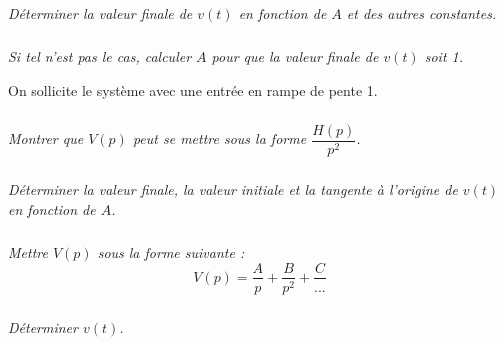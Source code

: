 \documentclass[10pt]{article}
\newif\ifprof
\begin{document}
\subparagraph{}
\textit{Déterminer la valeur finale de $v(t)$ en fonction de $A$ et des autres constantes. }
\ifprof
\begin{corrige}
D'après le théorème de la valeur finale, on a : 
$$
\lim\limits_{t\to +\infty} v(t)= 
\lim\limits_{p\to 0} p\cdot V(p)= \dfrac{AK_1}{1+K_1A}
$$
\end{corrige}
\else
\fi



\subparagraph{}
\textit{Si tel n’est pas le cas, calculer $A$ pour que la valeur finale de $v(t)$ soit 1.}
\ifprof
\begin{corrige}
Une valeur finale de 1 permet de satisfaire l'exigence d'avoir un écart statique nul.
$$
\dfrac{AK_1}{1+K_1A} = 1 
\Longleftrightarrow AK_1 = 1+K_1A
$$

\end{corrige}
\else
\fi

On sollicite le système avec une entrée en rampe de pente 1. 

\subparagraph{}
\textit{Montrer que $V(p)$ peut se mettre sous la forme $\dfrac{H(p)}{p^2}$. }
\ifprof
\begin{corrige}
La fonction de transfert d'une rampe de pente 1 est égale à $V_c(p)=\dfrac{1}{p^2}$
\end{corrige}
\else
\fi



\subparagraph{}
\textit{Déterminer la valeur finale, la valeur initiale et la tangente à l’origine de $v(t)$ en fonction de $A$.}
\ifprof
\begin{corrige}
\end{corrige}
\else
\fi


\subparagraph{}
\textit{Mettre $V(p)$ sous la forme suivante : }
$$
V(p)=\dfrac{A}{p}+\dfrac{B}{p^2} +\dfrac{C}{...}
$$

\ifprof
\begin{corrige}
\end{corrige}
\else
\fi



\subparagraph{}
\textit{Déterminer $v(t)$.}
\ifprof
\begin{corrige}
\end{corrige}
\else
\fi
\end{document}
